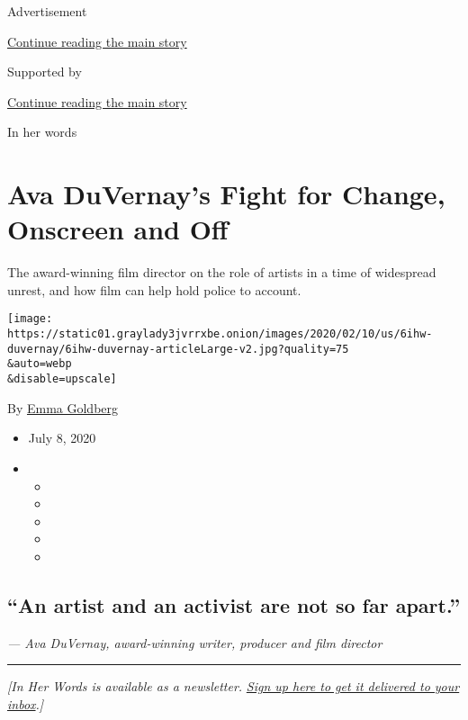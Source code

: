 Advertisement

\protect\hyperlink{after-top}{Continue reading the main story}

Supported by

\protect\hyperlink{after-sponsor}{Continue reading the main story}

In her words

\hypertarget{ava-duvernays-fight-for-change-onscreen-and-off}{%
\section{Ava DuVernay's Fight for Change, Onscreen and
Off}\label{ava-duvernays-fight-for-change-onscreen-and-off}}

The award-winning film director on the role of artists in a time of
widespread unrest, and how film can help hold police to account.

\texttt{[image: https://static01.graylady3jvrrxbe.onion/images/2020/02/10/us/6ihw-duvernay/6ihw-duvernay-articleLarge-v2.jpg?quality=75\\\&auto=webp\\\&disable=upscale]}

By \href{https://www.nytimes3xbfgragh.onion/by/emma-goldberg}{Emma
Goldberg}

\begin{itemize}
\item
  July 8, 2020
\item
  \begin{itemize}
  \item
  \item
  \item
  \item
  \item
  \end{itemize}
\end{itemize}

\hypertarget{an-artist-and-an-activist-are-not-so-far-apart}{%
\subsection{``An artist and an activist are not so far
apart.''}\label{an-artist-and-an-activist-are-not-so-far-apart}}

\emph{--- Ava DuVernay, award-winning writer, producer and film
director}

\begin{center}\rule{0.5\linewidth}{\linethickness}\end{center}

\emph{{[}In Her Words is available as a newsletter.}
\href{https://www.nytimes3xbfgragh.onion/newsletters/in-her-words}{\emph{Sign
up here to get it delivered to your inbox}}\emph{.{]}}

